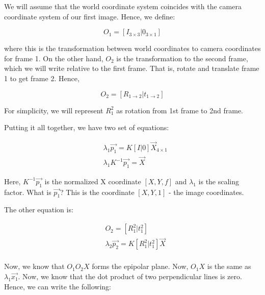 We will assume that the world coordinate system coincides with the camera coordinate system of our first image. Hence, we define:

\begin{equation*}
    O_1 = [I_{3\times3}|0_{3\times1}]
\end{equation*}

where this is the transformation between world coordinates to camera coordinates for frame 1. On the other hand, $O_2$ is the transformation to the second frame, which we will write relative to the first frame. That is, rotate and translate frame 1 to get frame 2. Hence,

\begin{equation*}
    O_2 = [R_{1\to 2}|t_{1\to 2}]
\end{equation*}

For simplicity, we will represent $R^2_1$ as rotation from 1st frame to 2nd frame.

Putting it all together, we have two set of equations:

\begin{equation}
\begin{split}
    &\lambda_1 \overrightarrow{p_1} = K[I|0]\overrightarrow{X}_{4\times1} \\
    &\lambda_1K^{-1}\overrightarrow{p_1} = \overrightarrow{X}
\end{split}
\end{equation}

Here, $K^{-1}\overrightarrow{p_1}$ is the normalized X coordinate $[X, Y, f]$ and $\lambda_1$ is the scaling factor. What is $\overrightarrow{p_1}$? This is the coordinate $[X, Y, 1]$ - the image coordinates.

The other equation is:

\begin{equation}
\begin{split}
    &O_2 = [R_{1}^2|t_{1}^2] \\
    &\lambda_2\overrightarrow{p_2} = K[R_1^2|t_1^2]\overrightarrow{X}\\ 
\end{split}
\end{equation}

Now, we know that $O_1O_2X$ forms the epipolar plane. Now, $O_1X$ is the same as $\lambda_1\overrightarrow{x_1}$. Now, we know that the dot product of two perpendicular lines is zero. Hence, we can write the following:

